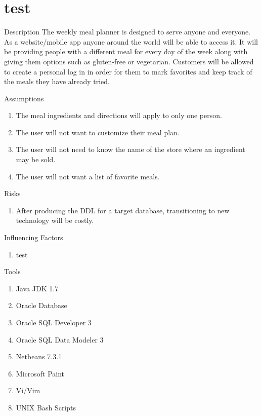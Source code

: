 \documentclass[a4paper,10pt,toc=graduated]{article}
\author{\docauthor}
\title{\doctitle}
\begin{document}
\myFirstPageHeader
\tableofcontents
\newpage
\section{test}
\begin{mySubsection}{Description}
\noindent
The weekly meal planner is designed to serve anyone and everyone.
As a website/mobile app anyone around the world will be able to access it.
It will be providing people with a different meal for every day of the week along with giving them options such as gluten-free or vegetarian.
Customers will be allowed to create a personal log in in order for them to mark favorites and keep track of the meals they have already tried.
\end{mySubsection}
\begin{mySubsection}{Assumptions}
\begin{enumerate}
\item The meal ingredients and directions will apply to only one person.
\item The user will not want to customize their meal plan.
\item The user will not need to know the name of the store where an ingredient may be sold.
\item The user will not want a list of favorite meals.
\end{enumerate}
\end{mySubsection}
\begin{mySubsection}{Risks}
\begin{enumerate}
\item After producing the DDL for a target database, transitioning to new technology will be costly.
\end{enumerate}
\end{mySubsection}
\begin{mySubsection}{Influencing Factors}
\begin{enumerate}
\item test
\end{enumerate}
\end{mySubsection}
\begin{mySubsection}{Tools}
\begin{enumerate}
\item Java JDK 1.7
\item Oracle Database
\item Oracle SQL Developer 3
\item Oracle SQL Data Modeler 3
\item Netbeans 7.3.1
\item Microsoft Paint
\item Vi/Vim
\item UNIX Bash Scripts
\end{enumerate}
\end{mySubsection}
\end{document}
